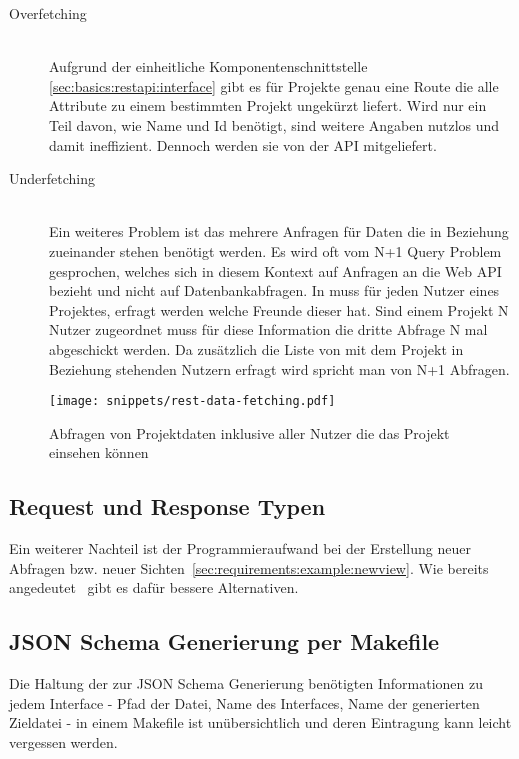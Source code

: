 \begin{description}
    \item[Overfetching\label{cons:overfetching}] \ \\
    Aufgrund der einheitliche Komponentenschnittstelle \ref{sec:basics:restapi:interface} gibt es für Projekte genau eine Route die alle Attribute zu einem bestimmten
    Projekt ungekürzt liefert. Wird nur ein Teil davon, wie Name und Id benötigt, sind weitere Angaben nutzlos und damit ineffizient.
    Dennoch werden sie von der API mitgeliefert.
    \item[Underfetching\label{cons:underfetching}] \ \\
    Ein weiteres Problem ist das mehrere Anfragen für Daten die in Beziehung zueinander stehen benötigt werden. Es wird oft vom N+1 Query Problem gesprochen, welches sich in diesem Kontext auf Anfragen an die Web API bezieht und nicht auf Datenbankabfragen.
    In  muss für jeden Nutzer eines Projektes, erfragt werden welche Freunde dieser hat.
    Sind einem Projekt N Nutzer zugeordnet muss für diese Information die dritte Abfrage N mal abgeschickt werden. Da zusätzlich die Liste von mit dem Projekt in Beziehung stehenden Nutzern erfragt wird spricht man von N+1 Abfragen.
\end{description}


\begin{figure}[h!]
    \centering
    \texttt{[image: snippets/rest-data-fetching.pdf]}
    \caption{Abfragen von Projektdaten inklusive aller Nutzer die das Projekt einsehen können}
    \label{req:neg:rest-data-fetching}
\end{figure}


\subsection{Request und Response Typen}
Ein weiterer Nachteil ist der Programmieraufwand bei der Erstellung neuer Abfragen bzw. neuer Sichten~\ref{sec:requirements:example:newview}.
Wie bereits angedeutet~\cite{tbl:newview} gibt es dafür bessere Alternativen.

\subsection{JSON Schema Generierung per Makefile}
Die Haltung der zur JSON Schema Generierung benötigten Informationen zu jedem Interface - Pfad der Datei, Name des Interfaces, Name der generierten Zieldatei -
in einem Makefile ist unübersichtlich und deren Eintragung kann leicht vergessen werden.

